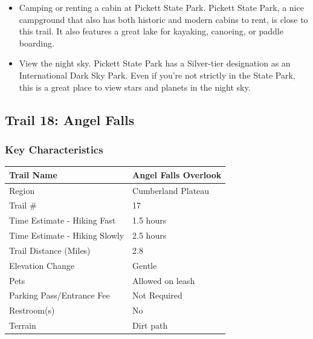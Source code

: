 \documentclass[
  letterpaper,
  DIV=11,
  numbers=noendperiod]{scrartcl}
\providecommand{\tightlist}{%
  \setlength{\itemsep}{0pt}\setlength{\parskip}{0pt}}\usepackage{longtable,booktabs,array}
\begin{document}
\begin{itemize}
\tightlist
\item
  Camping or renting a cabin at Pickett State Park. Pickett State Park,
  a nice campground that also has both historic and modern cabins to
  rent, is close to this trail. It also features a great lake for
  kayaking, canoeing, or paddle boarding.
\item
  View the night sky. Pickett State Park has a Silver-tier designation
  as an International Dark Sky Park. Even if you're not strictly in the
  State Park, this is a great place to view stars and planets in the
  night sky.
\end{itemize}

\hypertarget{trail-18-angel-falls}{%
\subsection{Trail 18: Angel Falls}\label{trail-18-angel-falls}}

\hypertarget{key-characteristics-17}{%
\subsubsection{Key Characteristics}\label{key-characteristics-17}}

\begin{longtable}[]{@{}ll@{}}
\toprule\noalign{}
Trail Name & Angel Falls Overlook \\
\midrule\noalign{}
\endhead
\bottomrule\noalign{}
\endlastfoot
Region & Cumberland Plateau \\
Trail \# & 17 \\
Time Estimate - Hiking Fast & 1.5 hours \\
Time Estimate - Hiking Slowly & 2.5 hours \\
Trail Distance (Miles) & 2.8 \\
Elevation Change & Gentle \\
Pets & Allowed on leash \\
Parking Pass/Entrance Fee & Not Required \\
Restroom(s) & No \\
Terrain & Dirt path \\
\end{longtable}
\end{document}
